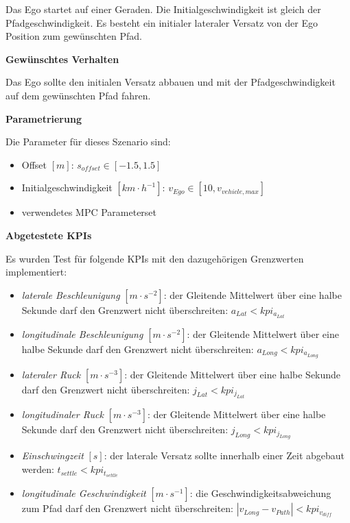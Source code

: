 \noindent Das Ego startet auf einer Geraden. Die Initialgeschwindigkeit ist gleich der Pfadgeschwindigkeit. Es besteht ein initialer lateraler Versatz von der Ego Position zum gewünschten Pfad.

\bigskip\noindent\textbf{Gewünschtes Verhalten}

\noindent Das Ego sollte den initialen Versatz abbauen und mit der Pfadgeschwindigkeit auf dem gewünschten Pfad fahren.

\bigskip\noindent\textbf{Parametrierung}

\noindent Die Parameter für dieses Szenario sind:
\begin{itemize}
    \item Offset $[m]$: $s_{offset} \in [-1.5,1.5]$ 
    \item Initialgeschwindigkeit $[km\cdot h^{-1}]$: $v_{Ego} \in [10,v_{vehicle,max}]$
    \item verwendetes MPC Parameterset 
\end{itemize}

\bigskip\noindent\textbf{Abgetestete KPIs}

\noindent Es wurden Test für folgende KPIs mit den dazugehörigen Grenzwerten implementiert:
\begin{itemize}
    \item \textit{laterale Beschleunigung} $[m\cdot s^{-2}]$: der Gleitende Mittelwert über eine halbe Sekunde darf den Grenzwert nicht überschreiten: $a_{Lat} < kpi_{a_{Lat}}$
    \item \textit{longitudinale Beschleunigung} $[m\cdot s^{-2}]$: der Gleitende Mittelwert über eine halbe Sekunde darf den Grenzwert nicht überschreiten: $a_{Long} < kpi_{a_{Long}}$
    \item \textit{lateraler Ruck} $[m\cdot s^{-3}]$: der Gleitende Mittelwert über eine halbe Sekunde darf den Grenzwert nicht überschreiten: $j_{Lat} < kpi_{j_{Lat}}$
    \item \textit{longitudinaler Ruck} $[m\cdot s^{-3}]$: der Gleitende Mittelwert über eine halbe Sekunde darf den Grenzwert nicht überschreiten: $j_{Long} < kpi_{j_{Long}}$
    \item \textit{Einschwingzeit} $[s]$: der laterale Versatz sollte innerhalb einer Zeit abgebaut werden: $t_{settle} < kpi_{t_{settle}}$
    \item \textit{longitudinale Geschwindigkeit} $[m\cdot s^{-1}]$: die Geschwindigkeitsabweichung zum Pfad darf den Grenzwert nicht überschreiten: $|v_{Long} - v_{Path}| < kpi_{v_{diff}}$
\end{itemize}

